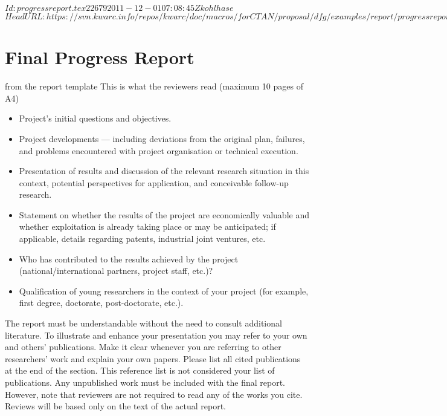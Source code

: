 \svnInfo $Id: progressreport.tex 22679 2011-12-01 07:08:45Z kohlhase $
\svnKeyword $HeadURL: https://svn.kwarc.info/repos/kwarc/doc/macros/forCTAN/proposal/dfg/examples/report/progressreport.tex $
\section{Final Progress Report}
\begin{todo}{from the report template}
This is what the reviewers read  (maximum 10 pages of A4)
  \begin{itemize}
  \item Project’s initial questions and objectives.
  \item Project developments --- including deviations from the original plan, failures,
    and problems encountered with project organisation or technical execution.
  \item Presentation of results and discussion of the relevant research situation in this
    context, potential perspectives for application, and conceivable follow-up research.
  \item Statement on whether the results of the project are economically valuable and whether exploitation is already taking place or may be anticipated; if applicable, details regarding patents, industrial joint ventures, etc.
  \item Who has contributed to the results achieved by the project (national/international partners, project staff, etc.)?
  \item Qualification of young researchers in the context of your project (for example, first degree, doctorate, post-doctorate, etc.).
  \end{itemize}
  The report must be understandable without the need to consult additional literature. To
  illustrate and enhance your presentation you may refer to your own and others’
  publications. Make it clear whenever you are referring to other researchers’ work and
  explain your own papers. Please list all cited publications at the end of the
  section. This reference list is not considered your list of publications. Any
  unpublished work must be included with the final report. However, note that reviewers
  are not required to read any of the works you cite. Reviews will be based only on the
  text of the actual report.
\end{todo}

